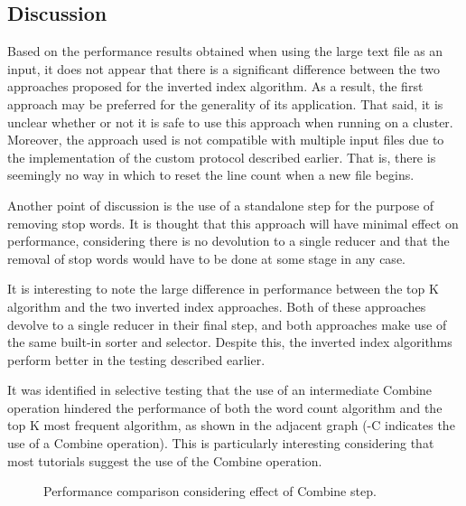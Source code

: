 \documentclass[journal,10pt]{IEEEtran}
\begin{document}
\subsection{Discussion}

Based on the performance results obtained when using the large text file as an input, it does not appear that there is a significant difference between the two approaches proposed for the inverted index algorithm. As a result, the first approach may be preferred for the generality of its application. That said, it is unclear whether or not it is safe to use this approach when running on a cluster. Moreover, the approach used is not compatible with multiple input files due to the implementation of the custom protocol described earlier. That is, there is seemingly no way in which to reset the line count when a new file begins.

Another point of discussion is the use of a standalone step for the purpose of removing stop words. It is thought that this approach will have minimal effect on performance, considering there is no devolution to a single reducer and that the removal of stop words would have to be done at some stage in any case.

It is interesting to note the large difference in performance between the top K algorithm and the two inverted index approaches. Both of these approaches devolve to a single reducer in their final step, and both approaches make use of the same built-in sorter and selector. Despite this, the inverted index algorithms perform better in the testing described earlier.

It was identified in selective testing that the use of an intermediate Combine operation hindered the performance of both the word count algorithm and the top K most frequent algorithm, as shown in the adjacent graph (-C indicates the use of a Combine operation). This is particularly interesting considering that most tutorials suggest the use of the Combine operation.

\begin{figure}[H]
    \centering
    \caption{Performance comparison considering effect of Combine step.}
    \label{fig:my_label}
\end{figure}
\end{document}
